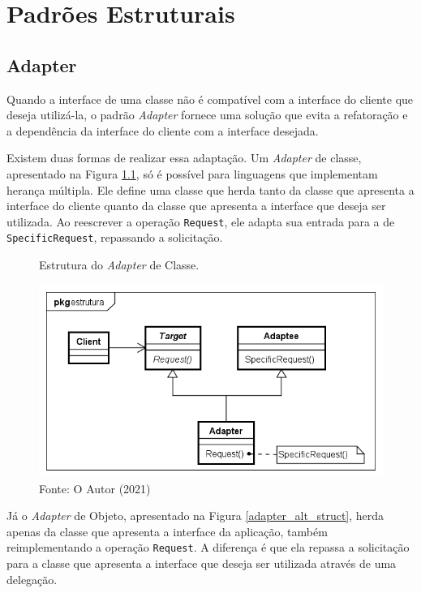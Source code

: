 \chapter{Padrões Estruturais}

\section{Adapter}

Quando a interface de uma classe não 
é compatível com a interface do cliente que deseja 
utilizá-la, o padrão \textit{Adapter} fornece uma 
solução que evita a refatoração e a dependência da 
interface do cliente com a interface desejada.\cite{gamma:1995}

Existem duas formas de realizar essa adaptação. Um \textit{Adapter} 
de classe, apresentado na Figura \ref{adapter_struct},  
só é possível para linguagens que implementam herança 
múltipla.
Ele define uma classe que herda tanto da classe que 
apresenta a interface do cliente quanto da classe que 
apresenta a interface que deseja ser utilizada. Ao 
reescrever a operação \texttt{Request}, ele adapta sua entrada 
para a de \texttt{SpecificRequest}, repassando a solicitação.\cite{gamma:1995}

\begin{figure}[htb]
	\caption{\label{adapter_struct}Estrutura do \textit{Adapter} de Classe.}
	\begin{center}
	    \includegraphics[scale=0.5]{5_padroes-contexto-funcional/5.2_estruturais/5.2.1_adapter/adapter_classe_estrutura.png}
	\end{center}
  \caption*{Fonte: O Autor (2021)}
\end{figure}

Já o \textit{Adapter} de Objeto, apresentado na Figura \ref{adapter_alt_struct}, 
herda apenas da classe que apresenta a interface 
da aplicação, também reimplementando a operação \texttt{Request}. 
A diferença é que ela repassa a solicitação para a 
classe que apresenta a interface que deseja ser 
utilizada através de uma delegação.\cite{gamma:1995}

